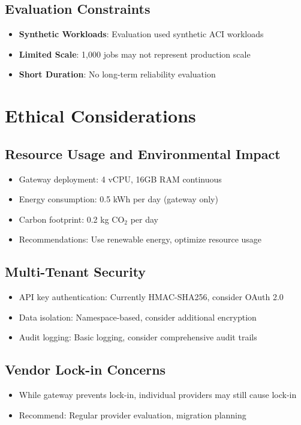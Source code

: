 \documentclass[10pt]{article}
\begin{document}
\subsection{Evaluation Constraints}
\begin{itemize}
    \item \textbf{Synthetic Workloads}: Evaluation used synthetic ACI workloads
    \item \textbf{Limited Scale}: 1,000 jobs may not represent production scale
    \item \textbf{Short Duration}: No long-term reliability evaluation
\end{itemize}

\section{Ethical Considerations}

\subsection{Resource Usage and Environmental Impact}
\begin{itemize}
    \item Gateway deployment: 4 vCPU, 16GB RAM continuous
    \item Energy consumption: 0.5 kWh per day (gateway only)
    \item Carbon footprint: 0.2 kg CO$_2$ per day
    \item Recommendations: Use renewable energy, optimize resource usage
\end{itemize}

\subsection{Multi-Tenant Security}
\begin{itemize}
    \item API key authentication: Currently HMAC-SHA256, consider OAuth 2.0
    \item Data isolation: Namespace-based, consider additional encryption
    \item Audit logging: Basic logging, consider comprehensive audit trails
\end{itemize}

\subsection{Vendor Lock-in Concerns}
\begin{itemize}
    \item While gateway prevents lock-in, individual providers may still cause lock-in
    \item Recommend: Regular provider evaluation, migration planning
\end{itemize}
\end{document}
